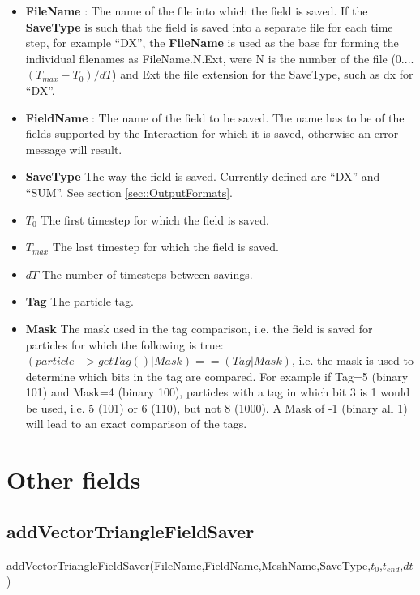 \documentclass{report}
\begin{document}
\begin{itemize}
\item \textbf{FileName} : The name of the file into which the field is saved. If the  \textbf{SaveType} is such that the field is saved into a separate file for each time step, for example ``DX'', the \textbf{FileName} is used as the base for forming the individual filenames as FileName.N.Ext, were N is the number of the file (0....$(T_{max}-T_0)/dT$) and Ext the file extension for the SaveType, such as dx for ``DX''.
\item \textbf{FieldName} : The name of the field to be saved. The name has to be of the fields supported by the Interaction for which it is saved, otherwise an error message will result.
\item \textbf{SaveType} The way the field is saved. Currently defined are ``DX'' and ``SUM''. See section \ref{sec::OutputFormats}.
\item \textbf{$T_0$} The first timestep for which the field is saved.
\item \textbf{$T_{max}$} The last timestep for which the field is saved.
\item \textbf{$dT$} The number of timesteps between savings. 
\item \textbf{Tag} The particle tag.
\item \textbf{Mask} The mask used in the tag comparison, i.e. the field is saved for particles for which the following is true: $(particle->getTag() | Mask ) == (Tag | Mask)$, i.e. the mask is used to determine which bits in the tag are compared. For example if Tag=5 (binary 101) and Mask=4 (binary 100), particles with a tag in which bit 3 is 1 would be used, i.e. 5 (101) or 6 (110), but not 8 (1000). A Mask of -1 (binary all 1) will lead to an exact comparison of the tags.     
\end{itemize}

\section{Other fields}

\subsection{addVectorTriangleFieldSaver}
\textsf{addVectorTriangleFieldSaver(FileName,FieldName,MeshName,SaveType,$t_0$,$t_{end}$,$dt$)}
\par \medskip
\end{document}
